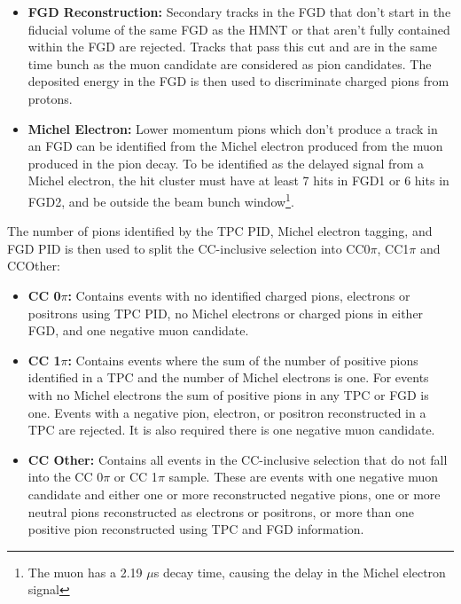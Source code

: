 \begin{itemize}
\begin{itemize}
\item \textbf{FGD Reconstruction:} Secondary tracks in the FGD that don't start in the fiducial volume of the same FGD as the HMNT or that aren't fully contained within the FGD are rejected. Tracks that pass this cut and are in the same time bunch as the muon candidate are considered as pion candidates. The deposited energy in the FGD is then used to discriminate charged pions from protons.

\item \textbf{Michel Electron:} Lower momentum pions which don't produce a track in an FGD can be identified from the Michel electron produced from the muon produced in the pion decay. To be identified as the delayed signal from a Michel electron, the hit cluster must have at least 7 hits in FGD1 or 6 hits in FGD2, and be outside the beam bunch window\footnote{The muon has a 2.19 $\mu$s decay time, causing the delay in the Michel electron signal}.

\end{itemize}
\end{itemize}

The number of pions identified by the TPC PID, Michel electron tagging, and FGD PID is then used to split the CC-inclusive selection into CC0$\pi$, CC1$\pi$ and CCOther:

\begin{itemize}

\item \textbf{CC 0$\pi$:} Contains events with no identified charged pions, electrons or positrons using TPC PID, no Michel electrons or charged pions in either FGD, and one negative muon candidate. 

\item \textbf{CC 1$\pi$:} Contains events where the sum of the number of positive pions identified in a TPC and the number of Michel electrons is one. For events with no Michel electrons the sum of positive pions in any TPC or FGD is one. Events with a negative pion, electron, or positron reconstructed in a TPC are rejected. It is also required there is one negative muon candidate.

\item \textbf{CC Other:} Contains all events in the CC-inclusive selection that do not fall into the CC 0$\pi$ or CC 1$\pi$ sample. These are events with one negative muon candidate and either one or more reconstructed negative pions, one or more neutral pions reconstructed as electrons or positrons, or more than one positive pion reconstructed using TPC and FGD information.

\end{itemize}

